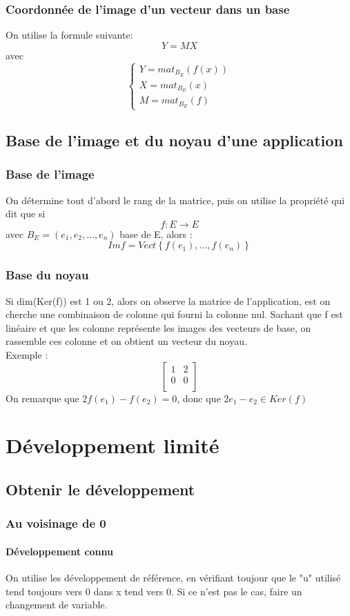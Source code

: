 \documentclass[a4paper,12 pt,oneside]{report}     %
\begin{document}
\subsection{Coordonnée de l'image d'un vecteur dans un base}
On utilise la formule suivante:
$$Y=MX$$
avec 
  \[\left\{\begin{array}{l}
   Y = mat_{B_E}(f(x))\\
   X = mat_{B_E}(x)\\
   M = mat_{B_E}(f)
  \end{array}\right.
\]
\section{Base de l'image et du noyau d'une application}
\subsection{Base de l'image}
On détermine tout d'abord le rang de la matrice, puis on utilise la propriété qui dit que si 
$$f : E \rightarrow E$$
avec $B_E=(e_1,e_2,...,e_n)$ base de E, alors :
$$Im f = Vect\left\{f(e_1),...,f(e_n)\right\}$$
\subsection{Base du noyau}
Si dim(Ker(f)) est 1 ou 2, alors on observe la matrice de l'application, est on cherche une combinaison de colonne qui fourni la colonne nul. Sachant que f est linéaire et que les colonne représente les images des vecteurs de base, on rassemble ces colonne et on obtient un vecteur du noyau.\\
Exemple : 
$$\begin{bmatrix}
  1 & 2 \\
  0 & 0 \\
\end{bmatrix}$$
On remarque que $2f(e_1)-f(e_2)=0$, donc que $2e_1-e_2 \in Ker(f)$ 
\chapter{Développement limité}
\section{Obtenir le développement}
\subsection{Au voisinage de 0}
\subsubsection{Développement connu}
On utilise les développement de référence, en vérifiant toujour que le "u" utilisé tend toujours vers 0 dans x tend vers 0. Si ce n'est pas le cas, faire un changement de variable.
\end{document}

